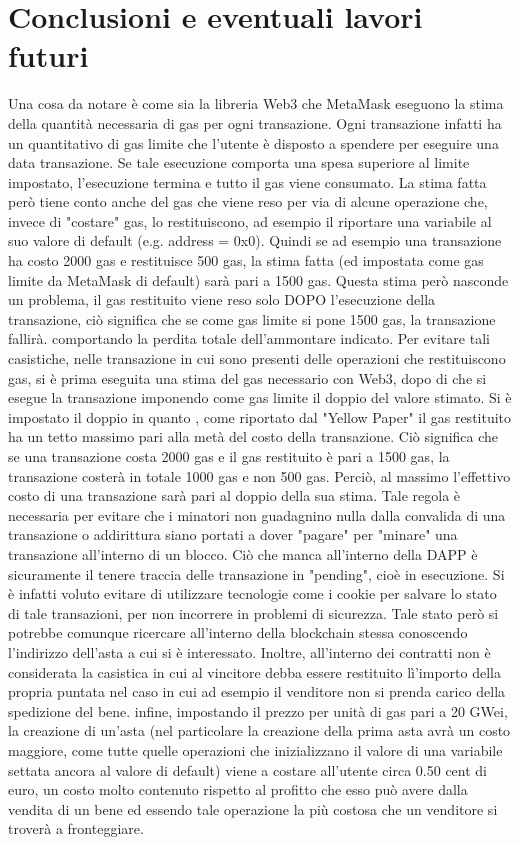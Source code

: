 \section{Conclusioni e eventuali lavori futuri}
Una cosa da notare è come sia la libreria Web3 che MetaMask eseguono la stima della quantità necessaria di gas per ogni transazione. Ogni transazione infatti ha un quantitativo di gas limite che l'utente è disposto a spendere per eseguire una data transazione. Se tale esecuzione comporta una spesa superiore al limite impostato, l'esecuzione termina e tutto il gas viene consumato. La stima fatta però tiene conto anche del gas che viene reso per via di alcune operazione che, invece di "costare" gas, lo restituiscono, ad esempio il riportare una variabile al suo valore di default (e.g. address = 0x0). Quindi se ad esempio una transazione ha costo 2000 gas e restituisce 500 gas, la stima fatta (ed impostata come gas limite da MetaMask di default) sarà pari a 1500 gas. Questa stima però nasconde un problema, il gas restituito viene reso solo DOPO l'esecuzione della transazione, ciò significa che se come gas limite si pone 1500 gas, la transazione fallirà. comportando la perdita totale dell'ammontare indicato. Per evitare tali casistiche, nelle transazione in cui sono presenti delle operazioni che restituiscono gas, si è prima eseguita una stima del gas necessario con Web3, dopo di che si esegue la transazione imponendo come gas limite il doppio del valore stimato. Si è impostato il doppio in quanto , come riportato dal "Yellow Paper" il gas restituito ha un tetto massimo pari alla metà del costo della transazione. Ciò significa che se una transazione costa 2000 gas e il gas restituito è pari a 1500 gas, la transazione costerà in totale 1000 gas e non 500 gas. Perciò, al massimo l'effettivo costo di una transazione sarà pari al doppio della sua stima. Tale regola è necessaria per evitare che i minatori non guadagnino nulla dalla convalida di una transazione o addirittura siano portati a dover "pagare" per "minare" una transazione all'interno di un blocco.\newline
Ciò che manca all'interno della DAPP è sicuramente il tenere traccia delle transazione in "pending", cioè in esecuzione. Si è infatti voluto evitare di utilizzare tecnologie come i cookie per salvare lo stato di tale transazioni, per non incorrere in problemi di sicurezza. Tale stato però si potrebbe comunque ricercare all'interno della blockchain stessa conoscendo l'indirizzo dell'asta a cui si è interessato. 
Inoltre, all'interno dei contratti non è considerata la casistica in cui al vincitore debba essere restituito lì'importo della propria puntata nel caso in cui ad esempio il venditore non si prenda carico della spedizione del bene.
infine, impostando il prezzo per unità di gas pari a 20 GWei, la creazione di un'asta (nel particolare la creazione della prima asta avrà un costo maggiore, come tutte quelle operazioni che inizializzano il valore di una variabile settata ancora al valore di default) viene a costare all'utente circa 0.50 cent di euro, un costo molto contenuto rispetto al profitto che esso può avere dalla vendita di un bene ed essendo tale operazione la più costosa che un venditore si troverà a fronteggiare.